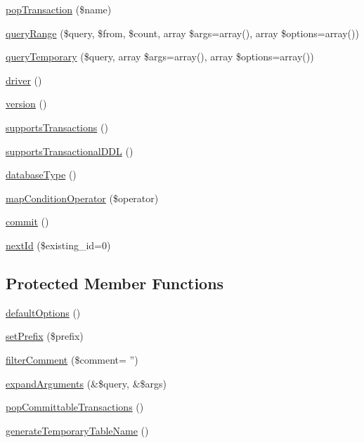\begin{DoxyCompactItemize}
\hyperlink{classDatabaseConnection_a0bca5087efb85e6480b953cc76ccfcb1}{popTransaction} (\$name)
\item 
\hyperlink{classDatabaseConnection_a1c97c77517b969270bb92c5c7e022a5d}{queryRange} (\$query, \$from, \$count, array \$args=array(), array \$options=array())
\item 
\hyperlink{classDatabaseConnection_ae4d9ad286187f493172da04fca77ca8f}{queryTemporary} (\$query, array \$args=array(), array \$options=array())
\item 
\hyperlink{classDatabaseConnection_a4a36a8d7352108c837c51a7172f966c3}{driver} ()
\item 
\hyperlink{classDatabaseConnection_a0c3c9a1fa27838cd1ce5d9cc8d8e6a29}{version} ()
\item 
\hyperlink{classDatabaseConnection_a6f5f74fd00cad354a98cea3ddef509a9}{supportsTransactions} ()
\item 
\hyperlink{classDatabaseConnection_a9ae6d1315a680a7250444d2aa9a3d30b}{supportsTransactionalDDL} ()
\item 
\hyperlink{classDatabaseConnection_a7dd7e76bc813c6a90a6d26a5529d67b0}{databaseType} ()
\item 
\hyperlink{classDatabaseConnection_aef82436b30fa08a6c81c34e11f3b1717}{mapConditionOperator} (\$operator)
\item 
\hyperlink{classDatabaseConnection_a7e938dd2dbf5bbef8e2eb06bda3eeb2f}{commit} ()
\item 
\hyperlink{classDatabaseConnection_a173e333ef1b61541cf37125468a37231}{nextId} (\$existing\_\-id=0)
\end{DoxyCompactItemize}
\subsection*{Protected Member Functions}
\begin{DoxyCompactItemize}
\item 
\hyperlink{classDatabaseConnection_a190539d6c494ef2d7ac90d21226de5a5}{defaultOptions} ()
\item 
\hyperlink{classDatabaseConnection_a8df68d814aa91a31f57990575d8349b6}{setPrefix} (\$prefix)
\item 
\hyperlink{classDatabaseConnection_a68426a046aed8dcc9a70fcd5734f226c}{filterComment} (\$comment= '')
\item 
\hyperlink{classDatabaseConnection_a4ba47f85f7a45b83de78af6acb1c059a}{expandArguments} (\&\$query, \&\$args)
\item 
\hyperlink{classDatabaseConnection_ade8d68cea197dc7703042ab505ed940d}{popCommittableTransactions} ()
\item 
\hyperlink{classDatabaseConnection_a8726459b0a9478a9a80d36237fa3ba30}{generateTemporaryTableName} ()
\end{DoxyCompactItemize}

